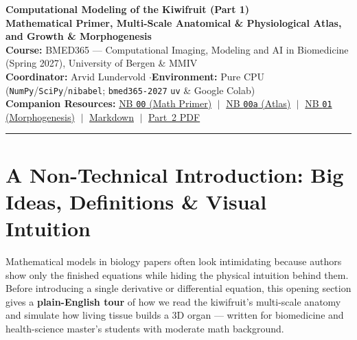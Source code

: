 \documentclass[10.5pt,a4paper]{article}
\begin{document}
\begin{tcolorbox}[enhanced, colback=uibblue!6, colframe=uibblue, boxrule=1.0pt, arc=3pt, left=10pt, right=10pt, top=9pt, bottom=9pt]
{\LARGE\bfseries\color{uibblue} Computational Modeling of the Kiwifruit (Part 1)}\\[3pt]
{\normalsize\bfseries Mathematical Primer, Multi-Scale Anatomical \& Physiological Atlas, and Growth \& Morphogenesis}\\[3pt]
{\small \textbf{Course:} BMED365 --- Computational Imaging, Modeling and AI in Biomedicine (Spring 2027), University of Bergen \& MMIV\\
\textbf{Coordinator:} Arvid Lundervold \quad$\cdot$\quad \textbf{Environment:} Pure CPU (\texttt{NumPy}/\texttt{SciPy}/\texttt{nibabel}; \texttt{bmed365-2027} \texttt{uv} \& Google Colab)\\[3pt]
\textbf{Companion Resources:} \href{https://github.com/arvidl/BMED365-2027/blob/main/Lab5-Comp-Mod/Kiwi-challenge/notebooks/00-kiwi-math-primer-for-biomedicine.ipynb}{NB \texttt{00} (Math Primer)} $\;\vert\;$ \href{https://github.com/arvidl/BMED365-2027/blob/main/Lab5-Comp-Mod/Kiwi-challenge/notebooks/00a-kiwi-anatomical-and-physiological-atlas.ipynb}{NB \texttt{00a} (Atlas)} $\;\vert\;$ \href{https://github.com/arvidl/BMED365-2027/blob/main/Lab5-Comp-Mod/Kiwi-challenge/notebooks/01-kiwi-growth-and-morphogenesis.ipynb}{NB \texttt{01} (Morphogenesis)} $\;\vert\;$ \href{https://github.com/arvidl/BMED365-2027/blob/main/Lab5-Comp-Mod/Kiwi-challenge/docs/foundations-atlas-and-morphogenesis.md}{Markdown} $\;\vert\;$ \href{https://github.com/arvidl/BMED365-2027/blob/main/Lab5-Comp-Mod/Kiwi-challenge/docs/inverse-problems-and-digital-twin.pdf}{Part~2 PDF}}
\end{tcolorbox}

\vspace{-2pt}
{\small\tableofcontents}
\vspace{4pt}
\hrule
\vspace{6pt}

\section{A Non-Technical Introduction: Big Ideas, Definitions \& Visual Intuition}

\begin{infobox}
Mathematical models in biology papers often look intimidating because authors show only the finished equations while hiding the physical intuition behind them. Before introducing a single derivative or differential equation, this opening section gives a \textbf{plain-English tour} of how we read the kiwifruit's multi-scale anatomy and simulate how living tissue builds a 3D organ --- written for biomedicine and health-science master's students with moderate math background.
\end{infobox}
\end{document}
